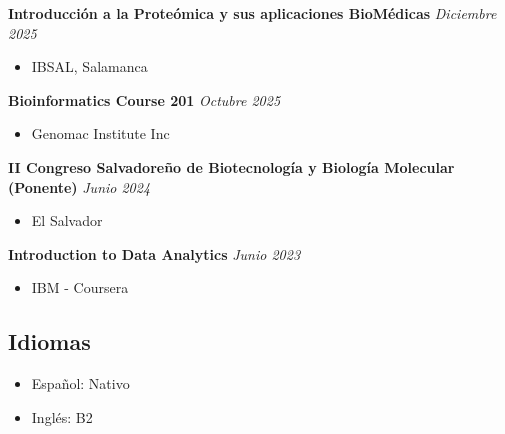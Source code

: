 \documentclass[a4paper,10pt]{article}
\begin{document}
\textbf{Introducción a la Proteómica y sus aplicaciones BioMédicas} \hfill \textit{Diciembre 2025}
\begin{itemize}
    \item IBSAL, Salamanca
\end{itemize}

\textbf{Bioinformatics Course 201} \hfill \textit{Octubre 2025}
\begin{itemize}
    \item Genomac Institute Inc
\end{itemize}

\textbf{II Congreso Salvadoreño de Biotecnología y Biología Molecular (Ponente)} \hfill \textit{Junio 2024}
\begin{itemize}
    \item El Salvador
\end{itemize}

\textbf{Introduction to Data Analytics} \hfill \textit{Junio 2023}
\begin{itemize}
    \item IBM - Coursera
\end{itemize}

\subsection*{Idiomas}
\begin{itemize}
  \item Español: Nativo
  \item Inglés: B2
\end{itemize}
\end{document}
